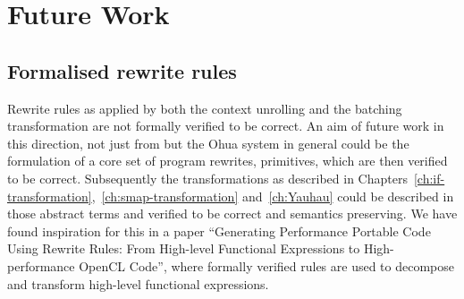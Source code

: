 \chapter{Future Work}

\label{ch:future-work}

\section{Formalised rewrite rules}

Rewrite rules as applied by both the context unrolling and the batching transformation are not formally verified to be correct.
An aim of future work in this direction, not just from \yauhau{} but the Ohua system in general could be the formulation of a core set of program rewrites, primitives, which are then verified to be correct.
Subsequently the transformations as described in Chapters~\ref{ch:if-transformation},~\ref{ch:smap-transformation} and~\ref{ch:Yauhau} could be described in those abstract terms and verified to be correct and semantics preserving.
We have found inspiration for this in a paper ``Generating Performance Portable Code Using Rewrite Rules: From High-level Functional Expressions to High-performance OpenCL Code''\cite{Steuwer:2015:GPP:2858949.2784754}, where formally verified rules are used to decompose and transform high-level functional expressions.

